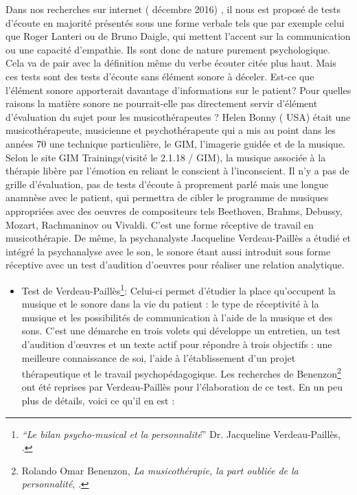 Dans nos recherches sur internet ( décembre 2016) , il nous est proposé
de tests d'écoute en majorité présentés sous une forme verbale tels
que par exemple celui que Roger Lanteri ou de Bruno Daigle, qui mettent
l'accent sur la communication ou une capacité d'empathie. Ils sont
donc de nature purement psychologique. Cela va de pair avec la définition
même du verbe écouter citée plus haut. Mais ces tests sont des tests
d'écoute sans élément sonore à déceler. Est-ce que l'élément sonore
apporterait davantage d'informations sur le patient? Pour quelles
raisons la matière sonore ne pourrait-elle pas directement servir
d'élément d'évaluation du sujet pour les musicothérapeutes ? 
Helen Bonny ( USA)
était une musicothérapeute, musicienne et psychothérapeute qui a mis au point dans les années 70 une technique particulière, le GIM,  l'imagerie guidée et de la musique. Selon le site GIM Trainings(visité le 2.1.18 /  GIM), la musique associée à la  thérapie libère  par l'émotion en reliant le conscient à l'inconscient. Il n'y a pas de grille d'évaluation, pas de tests d'écoute à proprement parlé mais  une longue anamnèse avec le patient, qui permettra de cibler le programme de musiques appropriées avec des oeuvres de compositeurs tels Beethoven, Brahms, Debussy, Mozart, Rachmaninov ou  Vivaldi. C'est une forme réceptive de travail en musicothérapie. 
De même, 
la psychanalyste Jacqueline Verdeau-Paillès  a étudié et intégré
la psychanalyse avec le son, le sonore étant  aussi  introduit sous forme réceptive
avec un test d'audition d'oeuvres pour réaliser une relation analytique.
\begin{itemize}
\item Test de Verdeau-Paillès\footnote{\emph{``Le bilan psycho-musical et la personnalité}'' Dr. Jacqueline
Verdeau-Paillès, \cite{verdeau-pailles}.}: Celui-ci permet d'étudier la place qu'occupent la musique et le sonore
dans la vie du patient : le type de réceptivité à la musique et les
possibilités de communication à l'aide de la musique et des sons.
C'est une démarche en trois volets qui développe un entretien, un
test d'audition d'\oe uvres et un texte actif pour répondre à trois
objectifs : une meilleure connaissance de soi, l'aide à l'établissement
d'un projet thérapeutique et le travail psychopédagogique. Les recherches
de Benenzon\footnote{Rolando Omar Benenzon, \emph{La musicothérapie, la part oubliée de la personnalité}, \cite{Benenzon2007}.} ont été reprises par Verdeau-Paillès pour l'élaboration de ce test.
En un peu plus de détails, voici ce qu'il en est :
\end{itemize}
